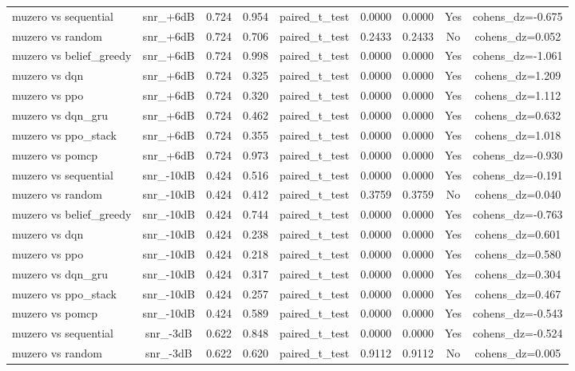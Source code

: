 \begin{table}[htbp]
\begin{tabular}{lcccccccc}
muzero vs sequential & snr_+6dB & 0.724 & 0.954 & paired_t_test & 0.0000 & 0.0000 & Yes & cohens_dz=-0.675 \\
muzero vs random & snr_+6dB & 0.724 & 0.706 & paired_t_test & 0.2433 & 0.2433 & No & cohens_dz=0.052 \\
muzero vs belief_greedy & snr_+6dB & 0.724 & 0.998 & paired_t_test & 0.0000 & 0.0000 & Yes & cohens_dz=-1.061 \\
muzero vs dqn & snr_+6dB & 0.724 & 0.325 & paired_t_test & 0.0000 & 0.0000 & Yes & cohens_dz=1.209 \\
muzero vs ppo & snr_+6dB & 0.724 & 0.320 & paired_t_test & 0.0000 & 0.0000 & Yes & cohens_dz=1.112 \\
muzero vs dqn_gru & snr_+6dB & 0.724 & 0.462 & paired_t_test & 0.0000 & 0.0000 & Yes & cohens_dz=0.632 \\
muzero vs ppo_stack & snr_+6dB & 0.724 & 0.355 & paired_t_test & 0.0000 & 0.0000 & Yes & cohens_dz=1.018 \\
muzero vs pomcp & snr_+6dB & 0.724 & 0.973 & paired_t_test & 0.0000 & 0.0000 & Yes & cohens_dz=-0.930 \\
muzero vs sequential & snr_-10dB & 0.424 & 0.516 & paired_t_test & 0.0000 & 0.0000 & Yes & cohens_dz=-0.191 \\
muzero vs random & snr_-10dB & 0.424 & 0.412 & paired_t_test & 0.3759 & 0.3759 & No & cohens_dz=0.040 \\
muzero vs belief_greedy & snr_-10dB & 0.424 & 0.744 & paired_t_test & 0.0000 & 0.0000 & Yes & cohens_dz=-0.763 \\
muzero vs dqn & snr_-10dB & 0.424 & 0.238 & paired_t_test & 0.0000 & 0.0000 & Yes & cohens_dz=0.601 \\
muzero vs ppo & snr_-10dB & 0.424 & 0.218 & paired_t_test & 0.0000 & 0.0000 & Yes & cohens_dz=0.580 \\
muzero vs dqn_gru & snr_-10dB & 0.424 & 0.317 & paired_t_test & 0.0000 & 0.0000 & Yes & cohens_dz=0.304 \\
muzero vs ppo_stack & snr_-10dB & 0.424 & 0.257 & paired_t_test & 0.0000 & 0.0000 & Yes & cohens_dz=0.467 \\
muzero vs pomcp & snr_-10dB & 0.424 & 0.589 & paired_t_test & 0.0000 & 0.0000 & Yes & cohens_dz=-0.543 \\
muzero vs sequential & snr_-3dB & 0.622 & 0.848 & paired_t_test & 0.0000 & 0.0000 & Yes & cohens_dz=-0.524 \\
muzero vs random & snr_-3dB & 0.622 & 0.620 & paired_t_test & 0.9112 & 0.9112 & No & cohens_dz=0.005 \\

\end{tabular}
\end{table}
